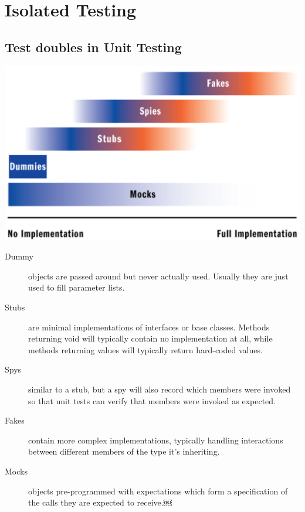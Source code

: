 \documentclass[a4paper,10pt]{article}
\begin{document}
\newpage
\section{Isolated Testing}

\subsection{Test doubles in Unit Testing}
\includegraphics[scale=0.8]{test_doubles.png}
\begin{description}
	\item[Dummy] objects are passed around but never actually used. Usually they are just used to fill parameter lists.
	\item[Stubs] are minimal implementations of interfaces or base classes. Methods returning void will typically contain no implementation at all, while methods returning values will typically return hard-coded values.
	\item[Spys] similar to a stub, but a spy will also record which members were invoked so that unit tests can verify that members were invoked as expected.
	\item[Fakes] contain more complex implementations, typically handling interactions between different members of the type it's inheriting.
	\item[Mocks] objects pre-programmed with expectations which form a specification of the calls they are expected to receive.￼
\end{description}
\end{document}
